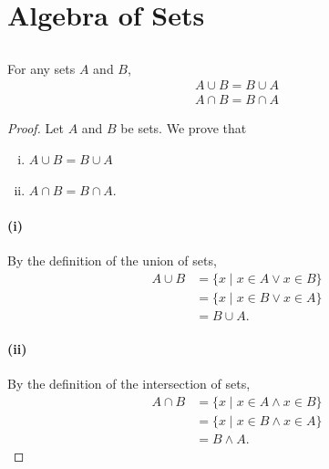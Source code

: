 \documentclass{report}
\begin{document}
\section{Algebra of Sets}%
\label{sec:algebra-sets}

\subsection{}%
\label{sub:commutative-laws}

For any sets $A$ and $B$,
  \begin{align*}
    A \cup B = B \cup A \\
    A \cap B = B \cap A
  \end{align*}

\begin{proof}

  \statementpadding



  \noindent Let $A$ and $B$ be sets.
  We prove that
    \begin{enumerate}[(i)]
      \item $A \cup B = B \cup A$
      \item $A \cap B = B \cap A$.
    \end{enumerate}

  \paragraph{(i)}%

    By the definition of the union of sets,
      \begin{align*}
        A \cup B
          & = \{ x \mid x \in A \lor x \in B \} \\
          & = \{ x \mid x \in B \lor x \in A \} \\
          & = B \cup A.
      \end{align*}

  \paragraph{(ii)}%

    By the definition of the intersection of sets,
      \begin{align*}
        A \cap B
          & = \{ x \mid x \in A \land x \in B \} \\
          & = \{ x \mid x \in B \land x \in A \} \\
          & = B \land A.
      \end{align*}

\end{proof}
\end{document}
